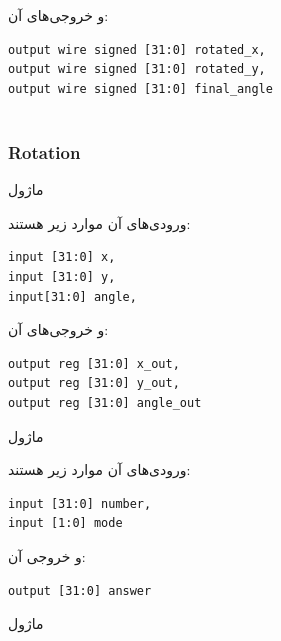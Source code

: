 \documentclass[12pt,titlepage,a4page , tikz , multi,table , svgnames,xcdraw]{article}
\begin{document}
و خروجی‌های آن:


\begin{latin}

\begin{verbatim}
output wire signed [31:0] rotated_x,
output wire signed [31:0] rotated_y,
output wire signed [31:0] final_angle
   
\end{verbatim}

\end{latin}


\newpage
\subsubsection{Rotation}



 ماژول  

 ورودی‌های آن موارد زیر هستند:

\begin{latin}
\begin{verbatim}
input [31:0] x,
input [31:0] y,
input[31:0] angle,
\end{verbatim}
\end{latin}

و خروجی‌های آن:

\begin{latin}
\begin{verbatim}
output reg [31:0] x_out,
output reg [31:0] y_out,
output reg [31:0] angle_out
\end{verbatim}
\end{latin}

\hrulefill


ماژول   
 
 ورودی‌های آن موارد زیر هستند:

\begin{latin}
\begin{verbatim}
input [31:0] number,
input [1:0] mode
\end{verbatim}
\end{latin}

و خروجی آن:

\begin{latin}
\begin{verbatim}
output [31:0] answer
\end{verbatim}
\end{latin}

\hrulefill


ماژول  
\end{document}
